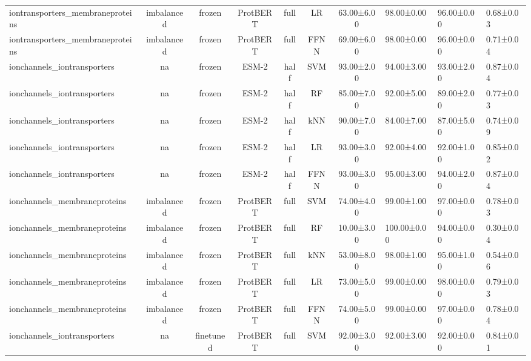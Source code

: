 \begin{tabular}{lcccccc}
iontransporters\_membraneproteins & imbalanced &         frozen &     ProtBERT &      full &         LR &  63.00±6.00 &  98.00±0.00 &  96.00±0.00 & 0.68±0.03 \\
iontransporters\_membraneproteins & imbalanced &         frozen &     ProtBERT &      full &       FFNN &  69.00±6.00 &  98.00±0.00 &  96.00±0.00 & 0.71±0.04 \\
     ionchannels\_iontransporters &         na &         frozen &        ESM-2 &      half &        SVM &  93.00±2.00 &  94.00±3.00 &  93.00±2.00 & 0.87±0.04 \\
     ionchannels\_iontransporters &         na &         frozen &        ESM-2 &      half &         RF &  85.00±7.00 &  92.00±5.00 &  89.00±2.00 & 0.77±0.03 \\
     ionchannels\_iontransporters &         na &         frozen &        ESM-2 &      half &        kNN &  90.00±7.00 &  84.00±7.00 &  87.00±5.00 & 0.74±0.09 \\
     ionchannels\_iontransporters &         na &         frozen &        ESM-2 &      half &         LR &  93.00±3.00 &  92.00±4.00 &  92.00±1.00 & 0.85±0.02 \\
     ionchannels\_iontransporters &         na &         frozen &        ESM-2 &      half &       FFNN &  93.00±3.00 &  95.00±3.00 &  94.00±2.00 & 0.87±0.04 \\
    ionchannels\_membraneproteins & imbalanced &         frozen &     ProtBERT &      full &        SVM &  74.00±4.00 &  99.00±1.00 &  97.00±0.00 & 0.78±0.03 \\
    ionchannels\_membraneproteins & imbalanced &         frozen &     ProtBERT &      full &         RF &  10.00±3.00 & 100.00±0.00 &  94.00±0.00 & 0.30±0.04 \\
    ionchannels\_membraneproteins & imbalanced &         frozen &     ProtBERT &      full &        kNN &  53.00±8.00 &  98.00±1.00 &  95.00±1.00 & 0.54±0.06 \\
    ionchannels\_membraneproteins & imbalanced &         frozen &     ProtBERT &      full &         LR &  73.00±5.00 &  99.00±0.00 &  98.00±0.00 & 0.79±0.03 \\
    ionchannels\_membraneproteins & imbalanced &         frozen &     ProtBERT &      full &       FFNN &  74.00±5.00 &  99.00±0.00 &  97.00±0.00 & 0.78±0.04 \\
     ionchannels\_iontransporters &         na &      finetuned &     ProtBERT &      full &        SVM &  92.00±3.00 &  92.00±3.00 &  92.00±0.00 & 0.84±0.01 \\

\end{tabular}
